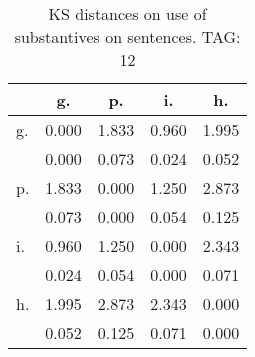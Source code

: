 \begin{table}[h!]
\begin{center}
\begin{tabular}{| l | c | c | c | c |}\hline
 & g. & p. & i. & h. \\\hline
g. & 0.000  & 1.833  & 0.960  & 1.995 \\\hline
 & 0.000  & 0.073  & 0.024  & 0.052 \\\hline
p. & 1.833  & 0.000  & 1.250  & 2.873 \\\hline
 & 0.073  & 0.000  & 0.054  & 0.125 \\\hline
i. & 0.960  & 1.250  & 0.000  & 2.343 \\\hline
 & 0.024  & 0.054  & 0.000  & 0.071 \\\hline
h. & 1.995  & 2.873  & 2.343  & 0.000 \\\hline
 & 0.052  & 0.125  & 0.071  & 0.000 \\\hline
\end{tabular}
\caption{KS distances on use of substantives on sentences. TAG: 12}
\end{center}
\end{table}